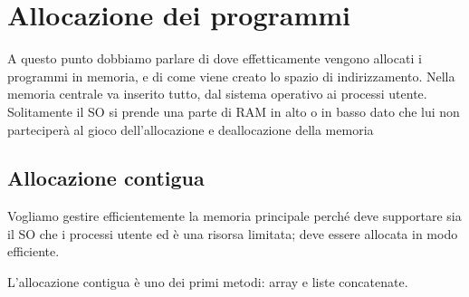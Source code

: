 






\section{Allocazione dei programmi}

A questo punto dobbiamo parlare di dove effetticamente vengono allocati i programmi in memoria, e di come viene creato lo spazio di indirizzamento.
Nella memoria centrale va inserito tutto, dal sistema operativo ai processi utente. Solitamente il SO si prende una parte di RAM in alto o in basso dato che lui non parteciperà al gioco dell'allocazione e deallocazione della memoria

\subsection{Allocazione contigua}

Vogliamo gestire efficientemente la memoria principale perché deve supportare sia il SO che i processi utente ed è una risorsa limitata; deve essere allocata in modo efficiente.

L'allocazione contigua è uno dei primi metodi: array e liste concatenate.

